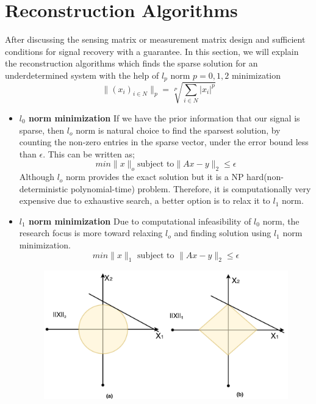 \section{ Reconstruction Algorithms}
After discussing the sensing matrix or measurement matrix design and sufficient conditions for signal recovery with a guarantee. In this section, we will explain the reconstruction algorithms which finds the sparse solution for an underdetermined system with the help of $l_p$ norm ${p=0,1,2}$ minimization
\begin{equation}
    \|(x_i)_{i \in N}\|_p= \sqrt[P]{\sum_{i\in N} |x_i|^p}
\end{equation}
\begin{itemize}
    \item \textbf{$l_0$ norm minimization}
    If we have the prior information that our signal is sparse, then $l_o$ norm is natural choice to find the  sparsest solution, by counting the non-zero entries in the sparse vector, under the error bound less than $\epsilon$. This can be written as;
    \begin{equation}
        min\|x\|_o \textrm{subject to} \|Ax -y\|_2 \le \epsilon
    \end{equation}
    Although $l_o$ norm provides the exact solution but it is a NP hard(non-deterministic polynomial-time) problem. Therefore, it is computationally very expensive due to exhaustive search, a better option is to relax it to $l_1$ norm.
     \item \textbf{$l_1$ norm minimization}
    Due to computational infeasibility of $l_0$ norm, the research focus is more toward relaxing $l_o$ and finding solution using $l_1$ norm minimization.
    \begin{equation}
        min\|x\|_1 \textrm{ subject to } \|Ax -y\|_2 \le \epsilon
        \label{l1-norn}
    \end{equation}
    \begin{figure}
    \label{norm-fig}
     \centering
     \includegraphics{figures/norm.pdf}

\end{figure}
\end{itemize}
